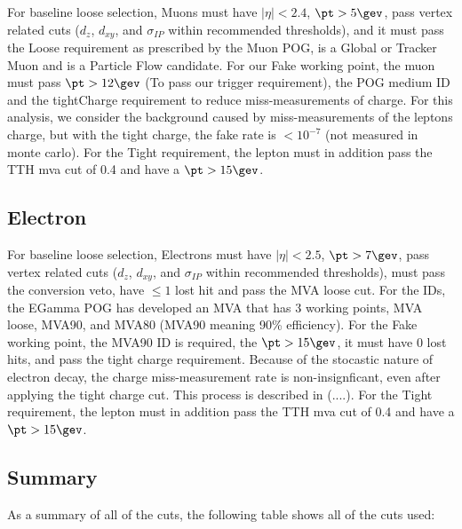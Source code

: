 For baseline loose selection, Muons must have $|\eta| < 2.4$, $\pt > 5\gev$, pass vertex related cuts ($d_{z}$, $d_{xy}$, and $\sigma_{IP}$ within recommended thresholds), and it must pass the Loose requirement as prescribed by the Muon POG, \ie is a Global or Tracker Muon and is a Particle Flow candidate. For our Fake working point, the muon must pass $\pt > 12\gev$ (To pass our trigger requirement), the POG medium ID and the tightCharge requirement to reduce miss-measurements of charge. For this analysis, we consider the background caused by miss-measurements of the leptons charge, but with the tight charge, the fake rate is $<10^{-7}$ (\ie not measured in monte carlo). For the Tight requirement, the lepton must in addition pass the TTH mva cut of 0.4 and have a $\pt > 15\gev$.

\subsection{Electron}\label{sec:electron}

For baseline loose selection, Electrons must have $|\eta| < 2.5$, $\pt > 7\gev$, pass vertex related cuts ($d_{z}$, $d_{xy}$, and $\sigma_{IP}$ within recommended thresholds), must pass the conversion veto, have $\le 1$ lost hit and pass the MVA loose cut. For the IDs, the EGamma POG has developed an MVA that has 3 working points, MVA loose, MVA90, and MVA80 (MVA90 meaning 90\% efficiency). For the Fake working point, the MVA90 ID is required, the $\pt > 15\gev$, it must have 0 lost hits, and pass the tight charge requirement. Because of the stocastic nature of electron decay, the charge miss-measurement rate is non-insignficant, even after applying the tight charge cut. This process is described in (....). For the Tight requirement, the lepton must in addition pass the TTH mva cut of 0.4 and have a $\pt > 15\gev$.

\subsection{Summary}\label{sec:lepsummary}
As a summary of all of the cuts, the following table shows all of the cuts used:

